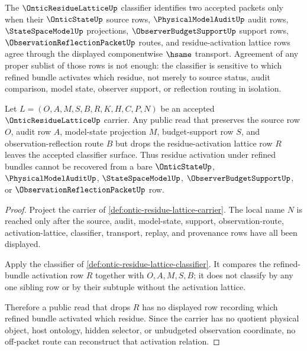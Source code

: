 \begin{definition}
\label{def:ontic-residue-lattice-classifier}
The $\OnticResidueLatticeUp$ classifier identifies two accepted packets only when their $\OnticStateUp$ source rows, $\PhysicalModelAuditUp$ audit rows, $\StateSpaceModelUp$ projections, $\ObserverBudgetSupportUp$ support rows, $\ObservationReflectionPacketUp$ routes, and residue-activation lattice rows agree through the displayed componentwise $\hsame$ transport. Agreement of any proper sublist of those rows is not enough: the classifier is sensitive to which refined bundle activates which residue, not merely to source status, audit comparison, model state, observer support, or reflection routing in isolation.
\end{definition}

\begin{theorem}
\label{thm:ontic-residue-lattice-activation-nonescape}
Let $L=(O,A,M,S,B,R,K,H,C,P,N)$ be an accepted $\OnticResidueLatticeUp$ carrier. Any public read that preserves the source row $O$, audit row $A$, model-state projection $M$, budget-support row $S$, and observation-reflection route $B$ but drops the residue-activation lattice row $R$ leaves the accepted classifier surface. Thus residue activation under refined bundles cannot be recovered from a bare $\OnticStateUp$, $\PhysicalModelAuditUp$, $\StateSpaceModelUp$, $\ObserverBudgetSupportUp$, or $\ObservationReflectionPacketUp$ row.
\end{theorem}
\begin{proof}
Project the carrier of \autoref{def:ontic-residue-lattice-carrier}. The local name $N$ is reached only after the source, audit, model-state, support, observation-route, activation-lattice, classifier, transport, replay, and provenance rows have all been displayed.

Apply the classifier of \autoref{def:ontic-residue-lattice-classifier}. It compares the refined-bundle activation row $R$ together with $O,A,M,S,B$; it does not classify by any one sibling row or by their subtuple without the activation lattice.

Therefore a public read that drops $R$ has no displayed row recording which refined bundle activated which residue. Since the carrier has no quotient physical object, host ontology, hidden selector, or unbudgeted observation coordinate, no off-packet route can reconstruct that activation relation.
\end{proof}

